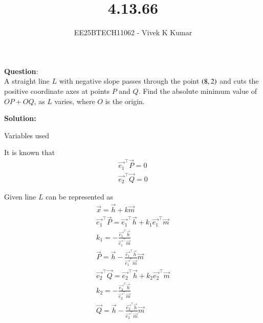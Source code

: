 \documentclass[journal]{IEEEtran}
\title{4.13.66}
\author{EE25BTECH11062 - Vivek K Kumar}
\begin{document}
\maketitle

\renewcommand{\thefigure}{\theenumi}
\renewcommand{\thetable}{\theenumi}


\textbf{Question}:\\
A straight line $L$ with negative slope passes through the point $\left(8, 2\right)$ and cuts the
positive coordinate axes at points $P$ and $Q$. Find the absolute minimum value of
$OP + OQ$, as $L$ varies, where $O$ is the origin.

\textbf{Solution: }

\begin{table}[H]    
  \centering
  
  \caption{Variables used}
  \label{tab:4.13.66}
\end{table}

It is known that 
\begin{align}
    \vec{e_1}^\top\vec{P} = 0 \\
    \vec{e_2}^\top\vec{Q} = 0
\end{align}

Given line $L$ can be represented as 
\begin{align}
    \vec{x} = \vec{h} + k\vec{m} \\
    \vec{e_1}^\top\vec{P} = \vec{e_1}^\top\vec{h} + k_1\vec{e_1}^\top\vec{m} \\
    k_1 = -\frac{\vec{e_1}^\top\vec{h}}{\vec{e_1}^\top\vec{m}} \\
    \vec{P} = \vec{h} - \frac{\vec{e_1}^\top\vec{h}}{\vec{e_1}^\top\vec{m}}\vec{m} \\
    \vec{e_2}^\top\vec{Q} = \vec{e_2}^\top\vec{h} + k_2\vec{e_2}^\top\vec{m} \\
    k_2 = -\frac{\vec{e_2}^\top\vec{h}}{\vec{e_2}^\top\vec{m}} \\
    \vec{Q} = \vec{h} - \frac{\vec{e_2}^\top\vec{h}}{\vec{e_2}^\top\vec{m}}\vec{m} 
\end{align}
\end{document}
